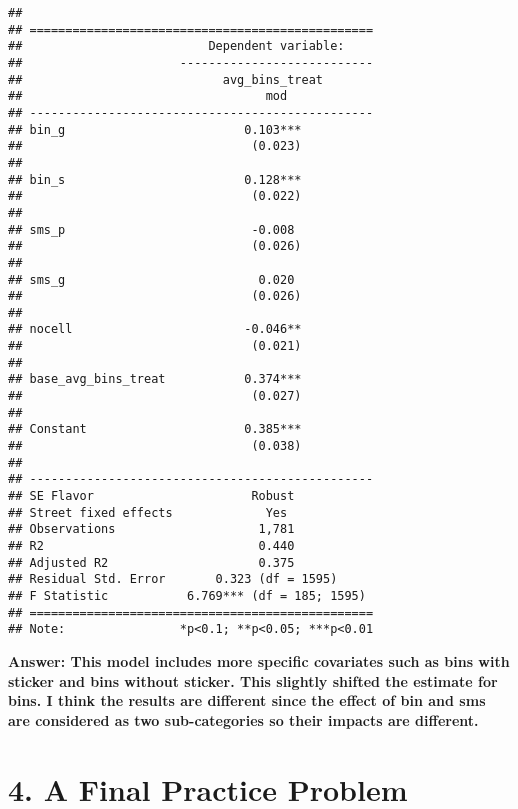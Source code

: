 \documentclass[
]{article}
\begin{document}
\begin{verbatim}
## 
## ================================================
##                          Dependent variable:    
##                      ---------------------------
##                            avg_bins_treat       
##                                  mod            
## ------------------------------------------------
## bin_g                         0.103***          
##                                (0.023)          
##                                                 
## bin_s                         0.128***          
##                                (0.022)          
##                                                 
## sms_p                          -0.008           
##                                (0.026)          
##                                                 
## sms_g                           0.020           
##                                (0.026)          
##                                                 
## nocell                        -0.046**          
##                                (0.021)          
##                                                 
## base_avg_bins_treat           0.374***          
##                                (0.027)          
##                                                 
## Constant                      0.385***          
##                                (0.038)          
##                                                 
## ------------------------------------------------
## SE Flavor                      Robust           
## Street fixed effects             Yes            
## Observations                    1,781           
## R2                              0.440           
## Adjusted R2                     0.375           
## Residual Std. Error       0.323 (df = 1595)     
## F Statistic           6.769*** (df = 185; 1595) 
## ================================================
## Note:                *p<0.1; **p<0.05; ***p<0.01
\end{verbatim}

\textbf{Answer: This model includes more specific covariates such as
bins with sticker and bins without sticker. This slightly shifted the
estimate for bins. I think the results are different since the effect of
bin and sms are considered as two sub-categories so their impacts are
different.}

\hypertarget{a-final-practice-problem}{%
\section{4. A Final Practice Problem}\label{a-final-practice-problem}}
\end{document}
